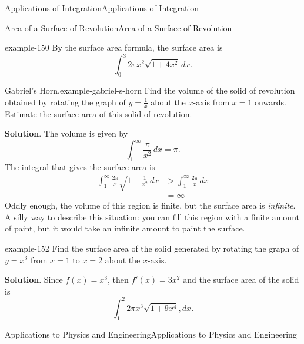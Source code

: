 \documentclass[10pt,]{book}
\numberwithin{equation}{section}
\newcommand{\gt}{>}
\newcommand{\amp}{&}
\begin{document}
\begin{chapterptx}{Applications of Integration}{}{Applications of Integration}{}{}
\begin{sectionptx}{Area of a Surface of Revolution}{}{Area of a Surface of Revolution}{}{}
\begin{example}{}{example-150}
\hypertarget{p-670}{}%
By the surface area formula, the surface area is%
\begin{equation*}
\int_{0}^{3}2 \pi x^{2} \sqrt{1+4x^{2}}\,dx.
\end{equation*}
%
\end{example}
\begin{example}{Gabriel's Horn.}{example-gabriel-s-horn}%
\hypertarget{p-671}{}%
Find the volume of the solid of revolution obtained by rotating the graph of \(y = \frac{1}{x}\) about the \(x\)-axis from \(x = 1\) onwards. Estimate the surface area of this solid of revolution.%
\par\smallskip%
\noindent\textbf{Solution}.\hypertarget{solution-147}{}\quad%
\hypertarget{p-672}{}%
The volume is given by%
\begin{equation*}
\int_{1}^{\infty}\frac{\pi}{x^{2}}\,dx = \pi\text{.}
\end{equation*}
The integral that gives the surface area is%
%
\begin{align*}
\int_{1}^{\infty}\frac{2\pi}{x}\sqrt{1 + \frac{1}{x^{2}}}\,dx \amp \gt \int_{1}^{\infty}\frac{2\pi}{x}\,dx \\
\amp = \infty 
\end{align*}
\hypertarget{p-673}{}%
Oddly enough, the volume of this region is finite, but the surface area is \emph{infinite}. A silly way to describe this situation: you can fill this region with a finite amount of paint, but it would take an infinite amount to paint the surface.%
\end{example}
\begin{example}{}{example-152}%
\hypertarget{p-674}{}%
Find the surface area of the solid generated by rotating the graph of \(y=x^{3}\) from \(x=1\) to \(x=2\) about the \(x\)-axis.%
\par\smallskip%
\noindent\textbf{Solution}.\hypertarget{solution-148}{}\quad%
\hypertarget{p-675}{}%
Since \(f(x)=x^{3}\), then \(f'(x)=3x^{2}\) and the surface area of the solid is%
\begin{equation*}
\int_{1}^{2}2\pi x^{3}\sqrt{1+9x^{4}},dx.
\end{equation*}
%
\end{example}
\end{sectionptx}
%
%
\typeout{************************************************}
\typeout{************************************************}
%
\begin{sectionptx}{Applications to Physics and Engineering}{}{Applications to Physics and Engineering}{}{}\label{section-applications-to-physics-and-engineering}

\end{sectionptx}
\end{chapterptx}
\end{document}
